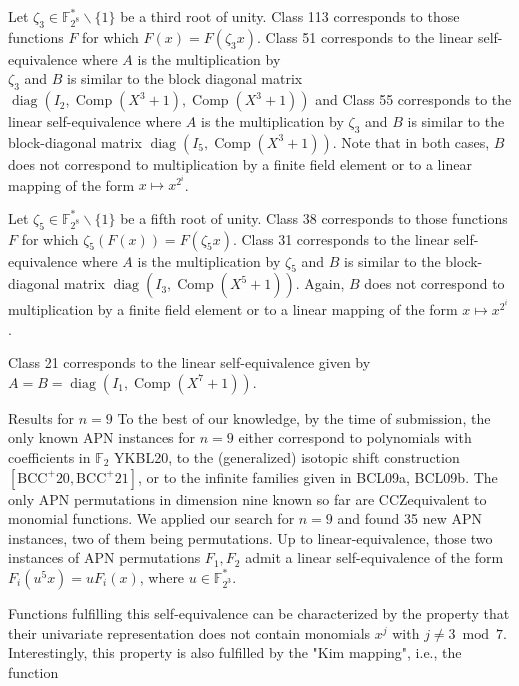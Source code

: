 \documentclass[10pt]{article}
\begin{document}
Let $\zeta_{3} \in \mathbb{F}_{2^{8}}^{*} \backslash\{1\}$ be a third root of unity. Class 113 corresponds to those functions $F$ for which $F(x)=F\left(\zeta_{3} x\right)$. Class 51 corresponds to the linear self-equivalence where $A$ is the multiplication by\\
$\zeta_{3}$ and $B$ is similar to the block diagonal matrix $\operatorname{diag}\left(I_{2}, \operatorname{Comp}\left(X^{3}+1\right), \operatorname{Comp}\left(X^{3}+1\right)\right)$ and Class 55 corresponds to the linear self-equivalence where $A$ is the multiplication by $\zeta_{3}$ and $B$ is similar to the block-diagonal matrix $\operatorname{diag}\left(I_{5}, \operatorname{Comp}\left(X^{3}+1\right)\right)$. Note that in both cases, $B$ does not correspond to multiplication by a finite field element or to a linear mapping of the form $x \mapsto x^{2^{i}}$.

Let $\zeta_{5} \in \mathbb{F}_{2^{8}}^{*} \backslash\{1\}$ be a fifth root of unity. Class 38 corresponds to those functions $F$ for which $\zeta_{5}(F(x))=F\left(\zeta_{5} x\right)$. Class 31 corresponds to the linear self-equivalence where $A$ is the multiplication by $\zeta_{5}$ and $B$ is similar to the block-diagonal matrix $\operatorname{diag}\left(I_{3}, \operatorname{Comp}\left(X^{5}+1\right)\right)$. Again, $B$ does not correspond to multiplication by a finite field element or to a linear mapping of the form $x \mapsto x^{2^{i}}$.

Class 21 corresponds to the linear self-equivalence given by $A=B=\operatorname{diag}\left(I_{1}, \operatorname{Comp}\left(X^{7}+1\right)\right)$.

Results for $n=9$ To the best of our knowledge, by the time of submission, the only known APN instances for $n=9$ either correspond to polynomials with coefficients in $\mathbb{F}_{2}$ YKBL20, to the (generalized) isotopic shift construction $\left[\mathrm{BCC}^{+} 20, \mathrm{BCC}^{+} 21\right]$, or to the infinite families given in BCL09a, BCL09b. The only APN permutations in dimension nine known so far are CCZequivalent to monomial functions. We applied our search for $n=9$ and found 35 new APN instances, two of them being permutations. Up to linear-equivalence, those two instances of APN permutations $F_{1}, F_{2}$ admit a linear self-equivalence of the form $F_{i}\left(u^{5} x\right)=u F_{i}(x)$, where $u \in \mathbb{F}_{2^{3}}^{*}$.

Functions fulfilling this self-equivalence can be characterized by the property that their univariate representation does not contain monomials $x^{j}$ with $j \neq 3 \bmod 7$. Interestingly, this property is also fulfilled by the "Kim mapping", i.e., the function
\end{document}
